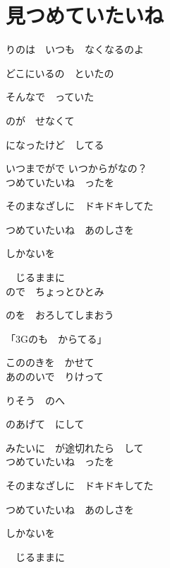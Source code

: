 \section{ 見つめていたいね}
\large{

りのは　いつも　なくなるのよ

どこにいるの　といたの

そんなで　っていた

のが　せなくて

になったけど　してる

いつまでがで いつからがなの？
\\

つめていたいね　ったを

そのまなざしに　ドキドキしてた

つめていたいね　あのしさを

しかないを

　じるままに
\\

ので　ちょっとひとみ

のを　おろしてしまおう

「3Gのも　からてる」

こののきを　かせて
\\

あののいで　りけって

りそう　のへ

のあげて　にして

みたいに　が途切れたら　して
\\

つめていたいね　ったを

そのまなざしに　ドキドキしてた

つめていたいね　あのしさを

しかないを

　じるままに

}
{ \ }

